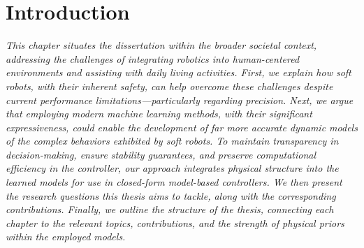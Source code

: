\chapter{Introduction}
\label{chp:introduction}

\textit{
This chapter situates the dissertation within the broader societal context, addressing the challenges of integrating robotics into human-centered environments and assisting with daily living activities. First, we explain how soft robots, with their inherent safety, can help overcome these challenges despite current performance limitations—particularly regarding precision. Next, we argue that employing modern machine learning methods, with their significant expressiveness, could enable the development of far more accurate dynamic models of the complex behaviors exhibited by soft robots. To maintain transparency in decision-making, ensure stability guarantees, and preserve computational efficiency in the controller, our approach integrates physical structure into the learned models for use in closed-form model-based controllers. We then present the research questions this thesis aims to tackle, along with the corresponding contributions. Finally, we outline the structure of the thesis, connecting each chapter to the relevant topics, contributions, and the strength of physical priors within the employed models.
}

\newpage





